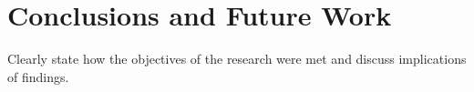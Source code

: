 \chapter{\rm\bfseries Conclusions and Future Work}
\label{ch:conclusions}

\mcgillguidelines Clearly state how the objectives of the research were met and discuss implications of findings.



